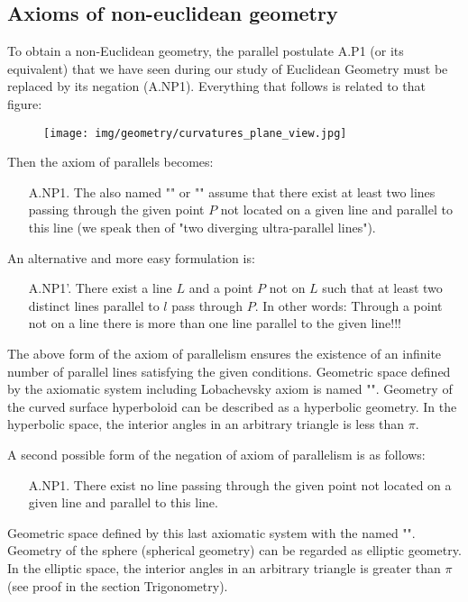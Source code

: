 	\subsection{Axioms of non-euclidean geometry}
	To obtain a non-Euclidean geometry, the parallel postulate A.P1 (or its equivalent) that we have seen during our study of Euclidean Geometry must be replaced by its negation (A.NP1). Everything that follows is related to that figure:
	\begin{figure}[H]
		\centering
		\texttt{[image: img/geometry/curvatures\_plane\_view.jpg]}
	\end{figure}	
	Then the axiom of parallels becomes:
	\begin{enumerate}[leftmargin=2cm]
		\item[A.NP1.] The also named "" or "" assume that there exist at least two lines passing through the given point $P$ not located on a given line and parallel to this line (we speak then of "two diverging ultra-parallel lines").
	\end{enumerate}
	An alternative and more easy formulation is:
	\begin{enumerate}[leftmargin=2cm]
		\item[A.NP1'.] There exist a line $L$ and a point $P$ not on $L$ such that at least two distinct lines parallel to $l$ pass through $P$. In other words:  Through a point not on a line there is more than one line parallel to the given line!!!
	\end{enumerate}
	The above form of the axiom of parallelism ensures the existence of an infinite number of parallel lines satisfying the given conditions. Geometric space defined by the axiomatic system including Lobachevsky axiom is named "". Geometry of the curved surface hyperboloid can be described as a hyperbolic geometry. In the hyperbolic space, the interior angles in an arbitrary triangle is less than $\pi$.
	
	A second possible form of the negation of axiom of parallelism is as follows:
	\begin{enumerate}[leftmargin=2cm]
		\item[A.NP1.] There exist no line passing through the given point not located on a given line and parallel to this line.
	\end{enumerate}
	Geometric space defined by this last axiomatic system with the named "". Geometry of the sphere (spherical geometry) can be regarded as elliptic geometry. In the elliptic space, the interior angles in an arbitrary triangle is greater than $\pi$ (see proof in the section Trigonometry).
	
